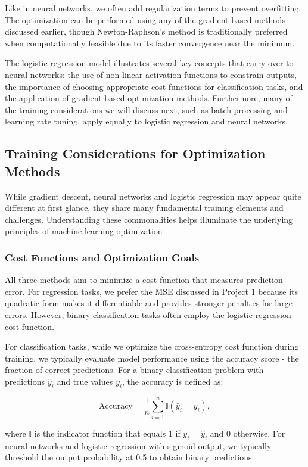 \documentclass[aps,pra,english,notitlepage,reprint,nofootinbib]{revtex4-1}  %
\begin{document}
Like in neural networks, we often add regularization terms to prevent overfitting. The optimization can be performed using any of the gradient-based methods discussed earlier, though Newton-Raphson's method is traditionally preferred when computationally feasible due to its faster convergence near the minimum. %

The logistic regression model illustrates several key concepts that carry over to neural networks: the use of non-linear activation functions to constrain outputs, the importance of choosing appropriate cost functions for classification tasks, and the application of gradient-based optimization methods. Furthermore, many of the training considerations we will discuss next, such as batch processing and learning rate tuning, apply equally to logistic regression and neural networks.
\subsection{Training Considerations for Optimization Methods}
While gradient descent, neural networks and logistic regression may appear quite different at first glance, they share many fundamental training elements and challenges. Understanding these commonalities helps illuminate the underlying principles of machine learning optimization

\subsubsection{Cost Functions and Optimization Goals}
All three methods aim to minimize a cost function that measures prediction error. For regression tasks, we prefer the MSE discussed in Project 1 because its quadratic form makes it differentiable and provides stronger penalties for large errors. However, binary classification tasks often employ the logistic regression cost function.

For classification tasks, while we optimize the cross-entropy cost function during training, we typically evaluate model performance using the accuracy score - the fraction of correct predictions. For a binary classification problem with predictions \( \hat{y}_i \) and true values \( y_i \), the accuracy is defined as:

\begin{equation}
    \text{Accuracy} = \frac{1}{n}\sum_{i=1}^{n} \mathbb{I}(\hat{y}_i = y_i),
\end{equation}

where \( \mathbb{I}\) is the indicator function that equals 1 if \( y_i = \hat{y}_i \) and 0 otherwise. For neural networks and logistic regression with sigmoid output, we typically threshold the output probability at 0.5 to obtain binary predictions:
\end{document}
